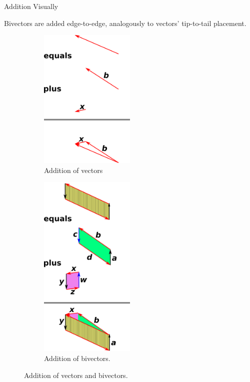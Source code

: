 \documentclass[aspectratio=169,xcolor=dvipsnames]{beamer}
\begin{document}
\begin{frame}{Addition Visually}

Bivectors are added edge-to-edge, analogously to vectors' tip-to-tail placement.


\begin{figure}[h]
      \centering
      \begin{subfigure}{0.4\textwidth}
            \centering
            \includegraphics[width=0.5\textwidth]{Figs/add-vectors.png}
            \caption{Addition of vectors}
            \label{fig:first}
      \end{subfigure}
      \begin{subfigure}{0.4\textwidth}
            \centering
            \includegraphics[width=0.5\textwidth]{Figs/add-bivectors.png}
            \caption{Addition of bivectors.}
            \label{fig:first}
      \end{subfigure}
      \caption{Addition of vectors and bivectors.}
      \label{fig:main}
  \end{figure}
\end{frame}
      
\end{document}

